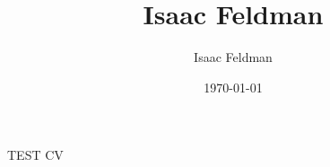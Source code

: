 \documentclass[11pt]{article}
\author{Isaac Feldman}
\date{\today}
\title{Isaac Feldman}
\begin{document}
\maketitle
\tableofcontents

TEST CV
\end{document}
